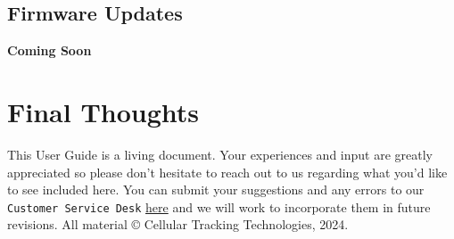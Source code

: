 \documentclass[
]{article}
\begin{document}
\hypertarget{firmware-updates}{%
\subsection{Firmware Updates}\label{firmware-updates}}

\textbf{Coming Soon}

\hypertarget{final-thoughts}{%
\section{Final Thoughts}\label{final-thoughts}}

This User Guide is a living document. Your experiences and input are
greatly appreciated so please don't hesitate to reach out to us
regarding what you'd like to see included here. You can submit your
suggestions and any errors to our \texttt{Customer\ Service\ Desk}
\href{https://celltracktech.com/pages/customer-service-desk-csd}{here}
and we will work to incorporate them in future revisions. All material ©
Cellular Tracking Technologies, 2024.

\newpag
\end{document}
